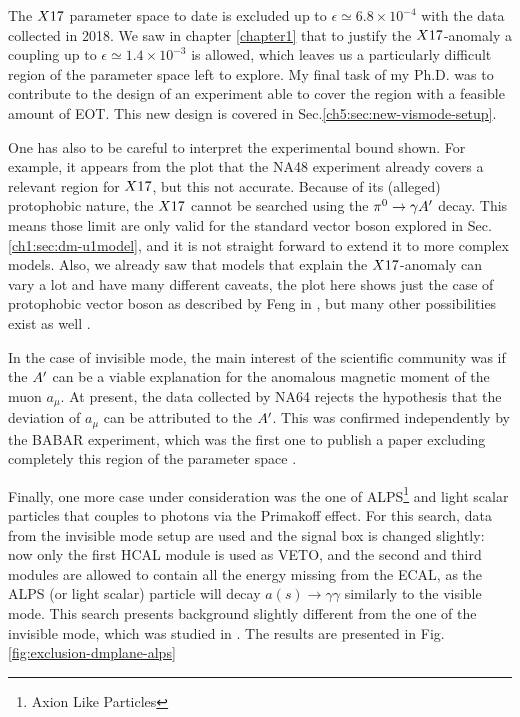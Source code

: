 The $X17$ parameter space to date is excluded up to $\epsilon \simeq 6.8 \times 10^{-4}$ with the data collected in 2018. We saw in chapter \ref{chapter1} that to justify the $X17$-anomaly a coupling up to $\epsilon \simeq 1.4 \times 10^{-3}$ is allowed, which leaves us a particularly difficult region of the parameter space left to explore. My final task of my Ph.D. was to contribute to the design of an experiment able to cover the region with a feasible amount of EOT. This new design is covered in Sec.\ref{ch5:sec:new-vismode-setup}.

One has also to be careful to interpret the experimental bound shown. For example, it appears from the plot that the NA48 experiment already covers a relevant region for $X17$, but this not accurate. Because of its (alleged) protophobic nature, the $X17$ cannot be searched using the $\pi^0 \rightarrow \gamma A'$ decay. This means those limit are only valid for the standard vector boson explored in Sec.\ref{ch1:sec:dm-u1model}, and it is not straight forward to extend it to more complex models. Also, we already saw that models that explain the $X17$-anomaly can vary a lot and have many different caveats, the plot here shows just the case of protophobic vector boson as described by Feng in \cite{Feng:2016jff}, but many other possibilities exist as well \cite{PhysRevD.95.035017}.

In the case of invisible mode, the main interest of the scientific community was if the $A'$ can be a viable explanation for the anomalous magnetic moment of the muon $a_{\mu}$. At present, the data collected by NA64 rejects the hypothesis that the deviation of $a_{\mu}$ can be attributed to the $A'$. This was confirmed independently by the BABAR experiment, which was the first one to publish a paper excluding completely this region of the parameter space \cite{PhysRevLett.119.131804}.

Finally, one more case under consideration was the one of ALPS\footnote{Axion Like Particles} and light scalar particles that couples to photons via the Primakoff effect. For this search, data from the invisible mode setup are used and the signal box is changed slightly: now only the first HCAL module is used as VETO, and the second and third modules are allowed to contain all the energy missing from the ECAL, as the ALPS (or light scalar) particle will decay $a(s) \to \gamma \gamma$ similarly to the visible mode. This search presents background slightly different from the one of the invisible mode, which was studied in \cite{Banerjee:2020fue}. The results are presented in Fig.\ref{fig:exclusion-dmplane-alps}

